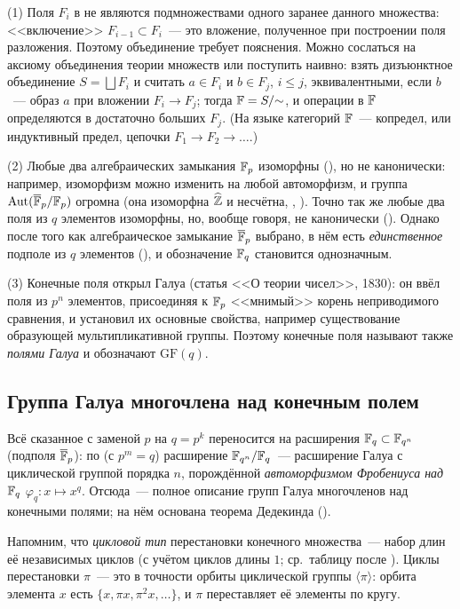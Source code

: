 \begin{remark}[4.25]
(1) Поля $F_i$ в  не являются подмножествами одного заранее данного множества: <<включение>> $F_{i-1}\subset F_i$~---
это вложение, полученное при построении поля разложения. Поэтому объединение требует пояснения. Можно сослаться на
аксиому объединения теории множеств или поступить наивно: взять дизъюнктное объединение $S=\bigsqcup F_i$ и считать
$a\in F_i$ и $b\in F_j$, $i\le j$, эквивалентными, если $b$~--- образ $a$ при вложении $F_i\to F_j$; тогда $\mathbb F=S/{\sim}$, и
операции в $\mathbb F$ определяются в достаточно больших $F_j$. (На языке категорий $\mathbb F$~--- копредел, или индуктивный
предел, цепочки $F_1\to F_2\to\dots$.)

(2) Любые два алгебраических замыкания $\mathbb F_p$ изоморфны (), но не канонически: например, изоморфизм можно
изменить на любой автоморфизм, и группа $\operatorname{Aut}(\overline{\mathbb F}_p/\mathbb F_p)$ огромна (она изоморфна $\widehat{\mathbb Z}$ и несчётна, , ). Точно так же любые два поля
из $q$ элементов изоморфны, но, вообще говоря, не канонически (). Однако после того как алгебраическое замыкание
$\overline{\mathbb F}_p$ выбрано, в нём есть \emph{единственное} подполе из $q$ элементов (), и обозначение $\mathbb F_q$ становится
однозначным.

(3) Конечные поля открыл Галуа (статья <<О теории чисел>>, 1830): он ввёл поля из $p^n$ элементов, присоединяя к $\mathbb F_p$
<<мнимый>> корень неприводимого сравнения, и установил их основные свойства, например существование образующей
мультипликативной группы. Поэтому конечные поля называют также \emph{полями Галуа} и обозначают $\mathrm{GF}(q)$.
\end{remark}

\subsection*{Группа Галуа многочлена над конечным полем}

Всё сказанное с заменой $p$ на $q=p^k$ переносится на расширения $\mathbb F_q\subset\mathbb F_{q^n}$ (подполя $\overline{\mathbb F}_p$): по  (с
$p^m=q$) расширение $\mathbb F_{q^n}/\mathbb F_q$~--- расширение Галуа с циклической группой порядка $n$, порождённой
\emph{автоморфизмом Фробениуса над $\mathbb F_q$} $\varphi_q\colon x\mapsto x^q$. Отсюда~--- полное описание групп Галуа
многочленов над конечными полями; на нём основана теорема Дедекинда ().

Напомним, что \emph{цикловой тип} перестановки конечного множества~--- набор длин её независимых циклов (с учётом
циклов длины $1$; ср.\ таблицу после ).
Циклы перестановки $\pi$~--- это в точности орбиты циклической группы $\langle\pi\rangle$: орбита элемента $x$ есть
$\{x,\pi x,\pi^2x,\dots\}$, и $\pi$ переставляет её элементы по кругу.

